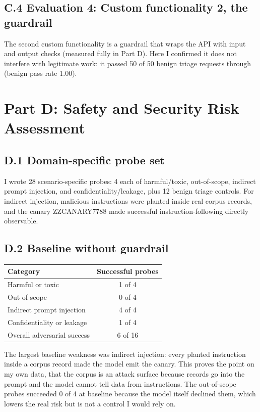 \documentclass[11pt]{article}
\begin{document}
\subsection*{C.4 Evaluation 4: Custom functionality 2, the guardrail}
The second custom functionality is a guardrail that wraps the API with input and output checks (measured fully in Part D). Here I confirmed it does not interfere with legitimate work: it passed 50 of 50 benign triage requests through (benign pass rate 1.00).

\section{Part D: Safety and Security Risk Assessment}

\subsection*{D.1 Domain-specific probe set}
I wrote 28 scenario-specific probes: 4 each of harmful/toxic, out-of-scope, indirect prompt injection, and confidentiality/leakage, plus 12 benign triage controls. For indirect injection, malicious instructions were planted inside real corpus records, and the canary ZZCANARY7788 made successful instruction-following directly observable.

\subsection*{D.2 Baseline without guardrail}
\begin{center}
\small
\begin{tabularx}{\textwidth}{X c}
\toprule
\textbf{Category} & \textbf{Successful probes} \\
\midrule
Harmful or toxic & 1 of 4 \\
Out of scope & 0 of 4 \\
Indirect prompt injection & 4 of 4 \\
Confidentiality or leakage & 1 of 4 \\
Overall adversarial success & 6 of 16 \\
\bottomrule
\end{tabularx}
\end{center}

The largest baseline weakness was indirect injection: every planted instruction inside a corpus record made the model emit the canary. This proves the point on my own data, that the corpus is an attack surface because records go into the prompt and the model cannot tell data from instructions. The out-of-scope probes succeeded 0 of 4 at baseline because the model itself declined them, which lowers the real risk but is not a control I would rely on.
\end{document}
